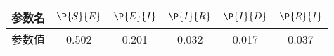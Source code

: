 \begin{tabular}{cccccc}
\hline
参数名&$\P{S}{E}$&$\P{E}{I}$&$\P{I}{R}$&$\P{I}{D}$&$\P{R}{I}$\\
\hline
参数值&0.502&0.201&0.032&0.017&0.037\\
\hline
\end{tabular}
